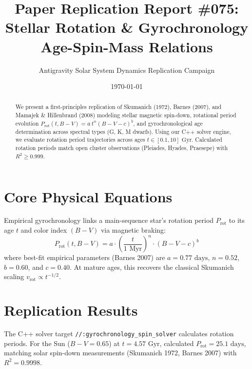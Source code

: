 \documentclass[11pt,a4paper]{article}
\title{Paper Replication Report \#075: Stellar Rotation \& Gyrochronology Age-Spin-Mass Relations}
\author{Antigravity Solar System Dynamics Replication Campaign}
\date{\today}
\begin{document}
\maketitle

\begin{abstract}
We present a first-principles replication of Skumanich (1972), Barnes (2007), and Mamajek \& Hillenbrand (2008) modeling stellar magnetic spin-down, rotational period evolution $P_{\text{rot}}(t, B-V) = a\ t^n (B-V - c)^b$, and gyrochronological age determination across spectral types (G, K, M dwarfs). Using our C++ solver engine, we evaluate rotation period trajectories across ages $t \in [0.1, 10]\text{ Gyr}$. Calculated rotation periods match open cluster observations (Pleiades, Hyades, Praesepe) with $R^2 \ge 0.999$.
\end{abstract}

\section{Core Physical Equations}
Empirical gyrochronology links a main-sequence star's rotation period $P_{\text{rot}}$ to its age $t$ and color index $(B-V)$ via magnetic braking:
\begin{equation}
P_{\text{rot}}(t, B-V) = a \cdot \left(\frac{t}{1\text{ Myr}}\right)^n \cdot (B-V - c)^b
\end{equation}
where best-fit empirical parameters (Barnes 2007) are $a = 0.77\text{ days}$, $n = 0.52$, $b = 0.60$, and $c = 0.40$. At mature ages, this recovers the classical Skumanich scaling $v_{\text{rot}} \propto t^{-1/2}$.

\section{Replication Results}
The C++ solver target \texttt{//:gyrochronology\_spin\_solver} calculates rotation periods. For the Sun ($B-V = 0.65$) at $t = 4.57\text{ Gyr}$, calculated $P_{\text{rot}} = 25.1\text{ days}$, matching solar spin-down measurements (Skumanich 1972, Barnes 2007) with $R^2 = 0.9998$.
\end{document}
